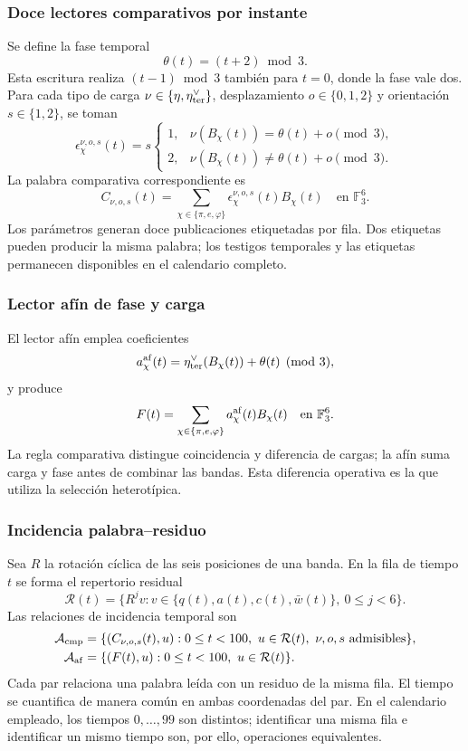 \subsubsection{Doce lectores comparativos por instante}

Se define la fase temporal
\[
 \theta(t)=(t+2)\bmod3.
\]
Esta escritura realiza $(t-1)\bmod3$ también para $t=0$, donde la fase
vale dos. Para cada tipo de carga
$\nu\in\{\eta,\eta_{\rm ter}^\vee\}$, desplazamiento
$o\in\{0,1,2\}$ y orientación $s\in\{1,2\}$, se toman
\[
 \epsilon_\chi^{\nu,o,s}(t)=s
 \begin{cases}
 1,&\nu(B_\chi(t))=\theta(t)+o\pmod3,\\
 2,&\nu(B_\chi(t))\ne\theta(t)+o\pmod3.
 \end{cases}
\]
La palabra comparativa correspondiente es
\begin{equation}
 C_{\nu,o,s}(t)=
 \sum_{\chi\in\{\pi,e,\varphi\}}
 \epsilon_\chi^{\nu,o,s}(t)B_\chi(t)
 \quad\text{en }\mathbb F_3^6.
 \label{eq:kdes-comparativo}
\end{equation}
Los parámetros generan doce publicaciones etiquetadas por fila. Dos
etiquetas pueden producir la misma palabra; los testigos temporales y
las etiquetas permanecen disponibles en el calendario completo.

\subsubsection{Lector afín de fase y carga}

El lector afín emplea coeficientes
\[
 a_\chi^{\rm af}(t)=\eta_{\rm ter}^\vee(B_\chi(t))+\theta(t)
 \pmod3,
\]
y produce
\begin{equation}
 F(t)=\sum_{\chi\in\{\pi,e,\varphi\}}
 a_\chi^{\rm af}(t)B_\chi(t)
 \quad\text{en }\mathbb F_3^6.
 \label{eq:kdes-afin}
\end{equation}
La regla comparativa distingue coincidencia y diferencia de cargas;
la afín suma carga y fase antes de combinar las bandas. Esta diferencia
operativa es la que utiliza la selección heterotípica.

\subsubsection{Incidencia palabra--residuo}

Sea $R$ la rotación cíclica de las seis posiciones de una banda. En la
fila de tiempo $t$ se forma el repertorio residual
\[
 \mathcal R(t)=\{R^jv:
      v\in\{q(t),a(t),c(t),\bar w(t)\},\ 0\leq j<6\}.
\]
Las relaciones de incidencia temporal son
\begin{align}
 \mathcal A_{\rm cmp}
 &=\{(C_{\nu,o,s}(t),u):
      0\leq t<100,\ u\in\mathcal R(t),\ \nu,o,s\text{ admisibles}\},\\
 \mathcal A_{\rm af}
 &=\{(F(t),u):0\leq t<100,\ u\in\mathcal R(t)\}.
 \label{eq:kdes-atlas}
\end{align}
Cada par relaciona una palabra leída con un residuo de la misma fila.
El tiempo se cuantifica de manera común en ambas coordenadas del par.
En el calendario empleado, los tiempos $0,\ldots,99$ son distintos;
identificar una misma fila e identificar un mismo tiempo son, por ello,
operaciones equivalentes.

